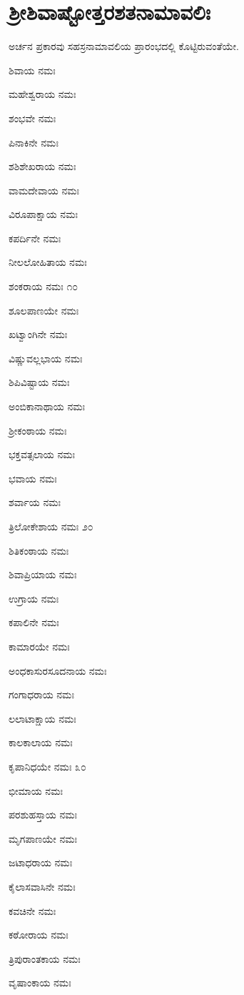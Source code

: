 
\chapter{ಶ್ರೀಶಿವಾಷ್ಟೋತ್ತರಶತನಾಮಾವಲಿಃ}

\begin{center}
ಅರ್ಚನ ಪ್ರಕಾರವು ಸಹಸ್ರನಾಮಾವಲಿಯ ಪ್ರಾರಂಭದಲ್ಲಿ ಕೊಟ್ಟಿರುವಂತೆಯೇ.
\end{center}

ಶಿವಾಯ ನಮಃ

ಮಹೇಶ್ವರಾಯ ನಮಃ

ಶಂಭವೇ ನಮಃ

ಪಿನಾಕಿನೇ ನಮಃ

ಶಶಿಶೇಖರಾಯ ನಮಃ

ವಾಮದೇವಾಯ ನಮಃ

ವಿರೂಪಾಕ್ಷಾಯ ನಮಃ

ಕಪರ್ದಿನೇ ನಮಃ

ನೀಲಲೋಹಿತಾಯ ನಮಃ

ಶಂಕರಾಯ ನಮಃ \num{೧೦}

ಶೂಲಪಾಣಯೇ ನಮಃ

ಖಟ್ವಾಂಗಿನೇ ನಮಃ

ವಿಷ್ಣುವಲ್ಲಭಾಯ ನಮಃ

ಶಿಪಿವಿಷ್ಟಾಯ ನಮಃ

ಅಂಬಿಕಾನಾಥಾಯ ನಮಃ

ಶ್ರೀಕಂಠಾಯ ನಮಃ

ಭಕ್ತವತ್ಸಲಾಯ ನಮಃ

ಭವಾಯ ನಮಃ

ಶರ್ವಾಯ ನಮಃ

ತ್ರಿಲೋಕೇಶಾಯ ನಮಃ \num{೨೦}

ಶಿತಿಕಂಠಾಯ ನಮಃ

ಶಿವಾಪ್ರಿಯಾಯ ನಮಃ

ಉಗ್ರಾಯ ನಮಃ

ಕಪಾಲಿನೇ ನಮಃ

ಕಾಮಾರಯೇ ನಮಃ

ಅಂಧಕಾಸುರಸೂದನಾಯ ನಮಃ

ಗಂಗಾಧರಾಯ ನಮಃ

ಲಲಾಟಾಕ್ಷಾಯ ನಮಃ

ಕಾಲಕಾಲಾಯ ನಮಃ

ಕೃಪಾನಿಧಯೇ ನಮಃ \num{೩೦}

ಭೀಮಾಯ ನಮಃ

ಪರಶುಹಸ್ತಾಯ ನಮಃ

ಮೃಗಪಾಣಯೇ ನಮಃ

ಜಟಾಧರಾಯ ನಮಃ

ಕೈಲಾಸವಾಸಿನೇ ನಮಃ

ಕವಚಿನೇ ನಮಃ

ಕಠೋರಾಯ ನಮಃ

ತ್ರಿಪುರಾಂತಕಾಯ ನಮಃ

ವೃಷಾಂಕಾಯ ನಮಃ

